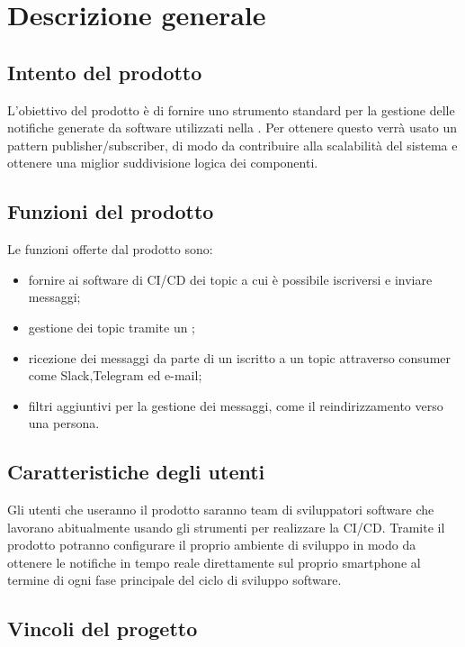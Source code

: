 \section{Descrizione generale}

	\subsection{Intento del prodotto}
    
    L'obiettivo del prodotto è di fornire uno strumento standard per la gestione delle notifiche generate da software utilizzati nella .
    Per ottenere questo verrà usato un pattern publisher/subscriber, di modo da contribuire alla scalabilità del sistema e ottenere una miglior suddivisione logica dei componenti.
	
	\subsection{Funzioni del prodotto}
	
    Le funzioni offerte dal prodotto sono:
    \begin{itemize}
		\item fornire ai software di CI/CD dei topic a cui è possibile iscriversi e inviare messaggi;
		\item gestione dei topic tramite un ;
        \item ricezione dei messaggi da parte di un  iscritto a un topic attraverso consumer come Slack,Telegram ed e-mail;
        \item filtri aggiuntivi per la gestione dei messaggi, come il reindirizzamento verso una persona.
	\end{itemize}

	\subsection{Caratteristiche degli utenti}
    
    Gli utenti che useranno il prodotto saranno team di sviluppatori software che lavorano abitualmente usando gli strumenti per realizzare la CI/CD.
    Tramite il prodotto potranno configurare il proprio ambiente di sviluppo in modo da ottenere le notifiche in tempo reale direttamente sul proprio smartphone al termine di ogni fase principale del ciclo di sviluppo software.
	
	\subsection{Vincoli del progetto}
	
